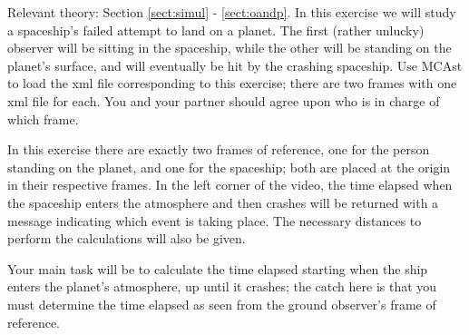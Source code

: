{\begin{multicols}{2}


\vspace{0.5cm}


Relevant theory: Section \ref{sect:simul} - \ref{sect:oandp}.\newline
In this exercise we will study a spaceship's failed attempt to land on a planet. The first (rather unlucky) observer will be sitting in the spaceship, while the other will be standing on the planet's surface, and will eventually be hit by the crashing spaceship. Use MCAst to load the xml file corresponding to this exercise; there are two frames with one xml file for each. You and your partner should agree upon who is in charge of which frame.

In this exercise there are exactly two frames of reference, one for the person standing on the planet, and one for the spaceship; both are placed at the origin in their respective frames. In the left corner of the video, the time elapsed when the spaceship enters the atmosphere and then crashes will be returned with a message indicating which event is taking place. The necessary distances to perform the calculations will also be given.

Your main task will be to calculate the time elapsed starting when the ship enters the planet's atmosphere, up until it crashes; the catch here is that you must determine the time elapsed as seen from the ground observer's frame of reference.


\end{multicols}}
